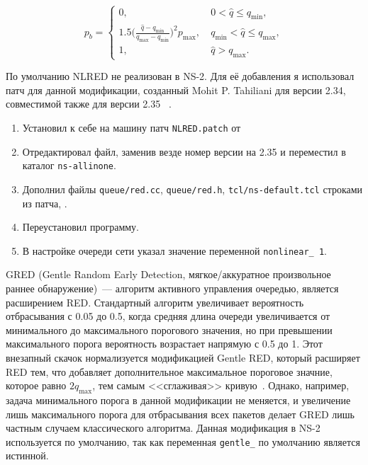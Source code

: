 \begin{equation}
\label{nlred}
p_{b} = \begin{cases}
        0, &  \ 0 < \hat{q} \leqslant q_{\min},
        \\
        1.5({\frac{\hat{q} - q_{\min}}{q_{\max} - q_{\min}})^2} {p_{\max}}, & \ q_{\min} < \hat{q} \leqslant q_{\max},
        \\
        1, &  \ \hat{q} > q_{\max}.
\end{cases}
\end{equation}


По умолчанию NLRED не реализован в NS-2. Для её добавления я использовал патч для данной модификации, созданный Mohit
  P. Tahiliani для версии 2.34, совместимой также для версии 2.35 ~\cite{nlredpatch}. 
  
\begin{enumerate}
\item Установил к себе на машину патч \verb|NLRED.patch| от 
\item Отредактировал файл, заменив везде номер версии на 2.35 и переместил в каталог \verb|ns-allinone|.
\item Дополнил файлы \verb|queue/red.cc|, \verb|queue/red.h|, \verb|tcl/ns-default.tcl| строками из патча, .
\item Переустановил программу.
\item В настройке очереди сети указал значение переменной \verb|nonlinear_ 1|.
\end{enumerate}



GRED (Gentle Random Early Detection, мягкое/аккуратное произвольное
раннее обнаружение)~--- алгоритм активного управления очередью,
является расширением RED. Стандартный алгоритм увеличивает
вероятность отбрасывания с 0.05 до 0.5, когда средняя длина очереди
увеличивается от минимального до максимального порогового значения, но
при превышении максимального порога вероятность возрастает напрямую с
0.5 до 1.  Этот внезапный скачок нормализуется модификацией Gentle
RED, который расширяет RED тем, что добавляет дополнительное
максимальное пороговое значние, которое равно $2q_{\max}$, тем самым
<<сглаживая>> кривую~\cite{GRED}. Однако, например, задача минимального порога в данной модификации не меняется, 
и увеличение лишь максимального порога для отбрасывания всех пакетов делает GRED лишь частным случаем классического алгоритма. 
Данная модификация в NS-2 используется по умолчанию, так как переменная \verb|gentle_| по умолчанию 
является истинной. 

